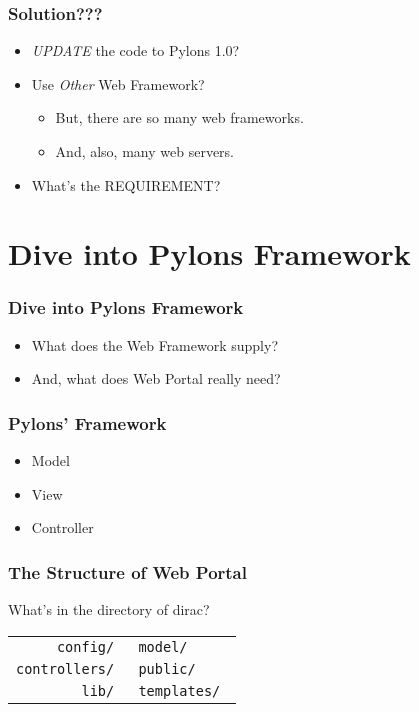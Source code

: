 \documentclass[20pt]{beamer}
\begin{document}
\begin{frame}
    \frametitle{Solution???}
    \begin{itemize}    
        \item \emph{UPDATE} the code to Pylons 1.0?
        \item Use \emph{Other} Web Framework?

            \begin{itemize}
                \item But, there are so many web frameworks.
                \item And, also, many web servers.
            \end{itemize}

        \item What's the REQUIREMENT?
    \end{itemize}
\end{frame}


\section{Dive into Pylons Framework}

\begin{frame}
    \frametitle{Dive into Pylons Framework}
    \begin{itemize}    
        \item What does the Web Framework supply?
        \item And, what does Web Portal really need?
    \end{itemize}
\end{frame}


\begin{frame}
    \frametitle{Pylons' Framework}
    \begin{itemize}    
        \item Model
        \item View
        \item Controller
    \end{itemize}
\end{frame}

\begin{frame}
    \frametitle{The Structure of Web Portal}

    What's in the directory of dirac?

    \begin{tabular}{rl}
        \hline
        \tt{config/} & \tt{model/} \\
   \tt{controllers/} & \tt{public/} \\
           \tt{lib/} & \tt{templates/} \\
        \hline
    \end{tabular}

\end{frame}
\end{document}
